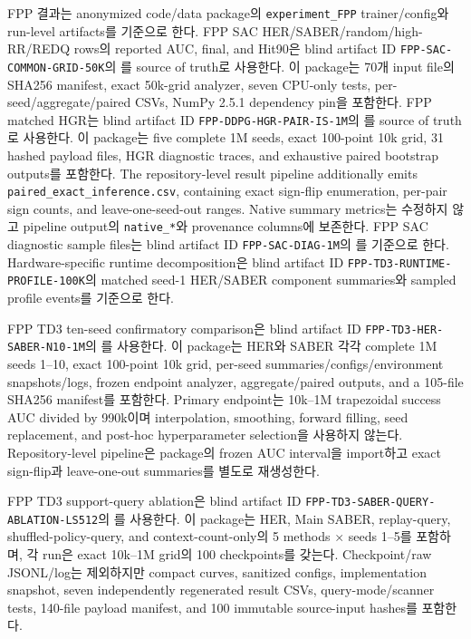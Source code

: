 \documentclass[letterpaper]{article}
\begin{document}
FPP 결과는 anonymized code/data package의 \texttt{experiment\_FPP} trainer/config와 run-level artifacts를 기준으로 한다. FPP SAC HER/SABER/random/high-RR/REDQ rows의 reported AUC, final, and Hit90은 blind artifact ID \texttt{FPP-SAC-COMMON-GRID-50K}의 를 source of truth로 사용한다. 이 package는 70개 input file의 SHA256 manifest, exact 50k-grid analyzer, seven CPU-only tests, per-seed/aggregate/paired CSVs, NumPy 2.5.1 dependency pin을 포함한다. FPP matched HGR는 blind artifact ID \texttt{FPP-DDPG-HGR-PAIR-IS-1M}의 를 source of truth로 사용한다. 이 package는 five complete 1M seeds, exact 100-point 10k grid, 31 hashed payload files, HGR diagnostic traces, and exhaustive paired bootstrap outputs를 포함한다. The repository-level result pipeline additionally emits \texttt{paired\_exact\_inference.csv}, containing exact sign-flip enumeration, per-pair sign counts, and leave-one-seed-out ranges. Native summary metrics는 수정하지 않고 pipeline output의 \texttt{native\_*}와 provenance columns에 보존한다. FPP SAC diagnostic sample files는 blind artifact ID \texttt{FPP-SAC-DIAG-1M}의 를 기준으로 한다. Hardware-specific runtime decomposition은 blind artifact ID \texttt{FPP-TD3-RUNTIME-PROFILE-100K}의 matched seed-1 HER/SABER component summaries와 sampled profile events를 기준으로 한다.

FPP TD3 ten-seed confirmatory comparison은 blind artifact ID \texttt{FPP-TD3-HER-SABER-N10-1M}의 를 사용한다. 이 package는 HER와 SABER 각각 complete 1M seeds 1--10, exact 100-point 10k grid, per-seed summaries/configs/environment snapshots/logs, frozen endpoint analyzer, aggregate/paired outputs, and a 105-file SHA256 manifest를 포함한다. Primary endpoint는 10k--1M trapezoidal success AUC divided by 990k이며 interpolation, smoothing, forward filling, seed replacement, and post-hoc hyperparameter selection을 사용하지 않는다. Repository-level pipeline은 package의 frozen AUC interval을 import하고 exact sign-flip과 leave-one-out summaries를 별도로 재생성한다.

FPP TD3 support-query ablation은 blind artifact ID \texttt{FPP-TD3-SABER-QUERY-ABLATION-LS512}의 를 사용한다. 이 package는 HER, Main SABER, replay-query, shuffled-policy-query, and context-count-only의 5 methods \(\times\) seeds 1--5를 포함하며, 각 run은 exact 10k--1M grid의 100 checkpoints를 갖는다. Checkpoint/raw JSONL/log는 제외하지만 compact curves, sanitized configs, implementation snapshot, seven independently regenerated result CSVs, query-mode/scanner tests, 140-file payload manifest, and 100 immutable source-input hashes를 포함한다.
\end{document}
